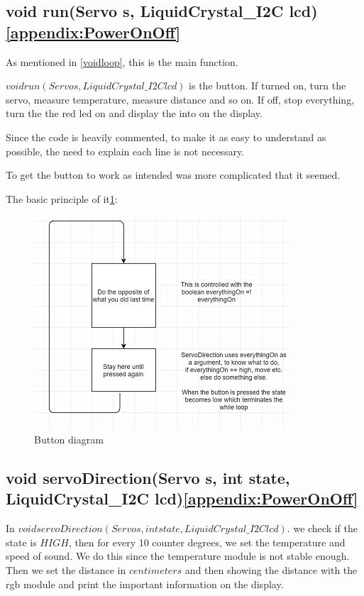 \subsection{void run(Servo s, LiquidCrystal\_I2C lcd)\ref{appendix:PowerOnOff}}
As mentioned in \ref{voidloop}, this is the main function. 

$void run(Servo s, LiquidCrystal\_I2C lcd)$ is the button. If turned on, turn the servo, measure  temperature, measure distance and so on. If off, stop everything, turn the the red led on and display the into on the display.

Since the code is heavily commented, to make it as easy to understand as possible, the need to explain each line is not necessary. 

To get the button to work as intended was more complicated that it seemed. 
\newpage

The basic principle of it\ref{fig:btnDiagram}:
\begin{figure}
  \includegraphics[width=\linewidth]{fig/buttonDiagram}
  \caption{Button diagram}
  \label{fig:btnDiagram}
\end{figure}

\subsection{void servoDirection(Servo s, int state, LiquidCrystal\_I2C lcd)\ref{appendix:PowerOnOff}}
In $void servoDirection(Servo s, int state, LiquidCrystal\_I2C lcd)$.
we check if the state is $HIGH$, then for every 10 counter degrees, we set the temperature and speed of sound. We do this since the temperature module is not stable enough. Then we set the distance in $centimeters$ and then showing the distance with the rgb module and print the important information on the display.

